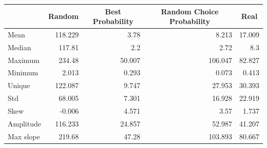 \documentclass[a4]{article}
\begin{document}
\begin{table}[t!]
\centering
\begin{tabular}{l|r|r|r|r|}
\cline{2-5}
\textbf{}                         & \multicolumn{1}{c|}{\textbf{Random}} & \multicolumn{1}{c|}{\textbf{Best Probability}} & \multicolumn{1}{c|}{\textbf{Random Choice Probability}} & \multicolumn{1}{c|}{\textbf{Real}} \\ \hline
\multicolumn{1}{|l|}{Mean}        & 118.229                              & 3.78                                           & 8.213                                                   & 17.009                             \\ \hline
\multicolumn{1}{|l|}{Median}      & 117.81                               & 2.2                                            & 2.72                                                    & 8.3                                \\ \hline
\multicolumn{1}{|l|}{Maximum}     & 234.48                               & 50.007                                         & 106.047                                                 & 82.827                             \\ \hline
\multicolumn{1}{|l|}{Minimum}     & 2.013                                & 0.293                                          & 0.073                                                   & 0.413                              \\ \hline
\multicolumn{1}{|l|}{Unique}      & 122.087                              & 9.747                                          & 27.953                                                  & 30.393                             \\ \hline
\multicolumn{1}{|l|}{Std}         & 68.005                               & 7.301                                          & 16.928                                                  & 22.919                             \\ \hline
\multicolumn{1}{|l|}{Skew}        & -0.006                               & 4.571                                          & 3.57                                                    & 1.737                              \\ \hline
\multicolumn{1}{|l|}{Amplitude}   & 116.233                              & 24.857                                         & 52.987                                                  & 41.207                             \\ \hline
\multicolumn{1}{|l|}{Max slope}   & 219.68                               & 47.28                                          & 103.893                                                 & 80.667                             \\ \hline

\end{tabular}
\end{table}
\end{document}
